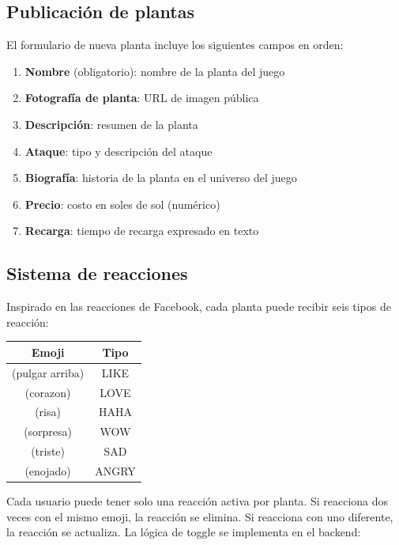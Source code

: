 \documentclass[12pt,a4paper]{article}
\begin{document}
\subsection{Publicación de plantas}

El formulario de nueva planta incluye los siguientes campos en orden:

\begin{enumerate}
  \item \textbf{Nombre} (obligatorio): nombre de la planta del juego
  \item \textbf{Fotografía de planta}: URL de imagen pública
  \item \textbf{Descripción}: resumen de la planta
  \item \textbf{Ataque}: tipo y descripción del ataque
  \item \textbf{Biografía}: historia de la planta en el universo del juego
  \item \textbf{Precio}: costo en soles de sol (numérico)
  \item \textbf{Recarga}: tiempo de recarga expresado en texto
\end{enumerate}

\subsection{Sistema de reacciones}

Inspirado en las reacciones de Facebook, cada planta puede recibir seis tipos de reacción:

\begin{center}
\begin{tabular}{cc}
\toprule
Emoji & Tipo \\
\midrule
(pulgar arriba) & LIKE \\
(corazon) & LOVE \\
(risa) & HAHA \\
(sorpresa) & WOW \\
(triste) & SAD \\
(enojado) & ANGRY \\
\bottomrule
\end{tabular}
\end{center}

Cada usuario puede tener solo una reacción activa por planta. Si reacciona dos veces con el mismo emoji, la reacción se elimina. Si reacciona con uno diferente, la reacción se actualiza. La lógica de toggle se implementa en el backend:
\end{document}
